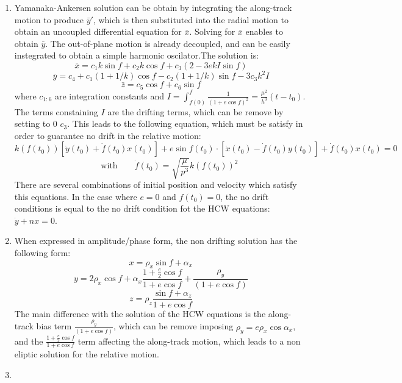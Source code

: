 \documentclass[a4paper]{article}
\begin{document}
\begin{enumerate}[label=\emph{\alph*)}]
    \item  %
      Yamanaka-Ankersen solution can be obtain by integrating the along-track motion to produce $\bar{y}'$, which is then substituted into the radial motion to obtain an uncoupled differential equation for $\bar{x}$. Solving for $\bar{x}$ enables to obtain  $\bar{y}$. The out-of-plane motion is already decoupled, and can be easily instegrated to obtain a simple harmonic oscilator.The solution is:
   \[\bar{x} = c_1 k \sin{f}+c_2 k \cos{f} + c_3 (2 - 3 e k I\sin{f})\]
   \[\bar{y} = c_4 + c_1 (1+1/k)\cos{f} - c_2 (1+1/k) \sin{f} - 3 c_3 k^2 I \]
   \[\bar{z} = c_5 \cos{f} + c_6 \sin{f}\]
   where $c_{1:6}$ are integration constants and $I = \int_{f(0)}^{f}{\frac{1}{(1+e\cos{f})^2}} = \frac{\mu^2}{h^3}(t-t_0)$. The terms constaining $I$ are the drifting terms, which can be remove by setting to 0 $c_3$. This leads to the following equation, which must be satisfy in order to guarantee no drift in the relative motion:
   \[k(f(t_0)) [\dot{y}(t_0)+\dot{f}(t_0)x(t_0)] + e \sin{f(t_0)}\cdot [\dot{x}(t_0) - \dot{f}(t_0)y(t_0)] + \dot{f}(t_0)x(t_0) = 0 \]
   \[ \qquad  \mathrm{with} \qquad \dot{f}(t_0) = \sqrt{\frac{\mu}{p^3}}k(f(t_0))^2  \]
   There are several combinations of initial position and velocity which satisfy this equations. In the case where $e=0$ and $f(t_0)=0$, the no drift conditions is equal to the no drift condition fot the HCW equations: $\dot{y}+nx=0$.
  
 \item %
   When expressed in amplitude/phase form, the non drifting solution has the following form:
   \[x = \rho_x \sin{f+\alpha_x} \]
   \[y = 2 \rho_x \cos{f+\alpha_x} \frac{1+\frac{e}{2}\cos{f}}{1+e\cos{f}} + \frac{\rho_y}{(1+e\cos{f})} \]
   \[z = \rho_z \frac{\sin{f+\alpha_z}}{1+e\cos{f}} \]
   The main difference with the solution of the HCW equations is the along-track bias term  $\frac{\rho_y}{(1+e\cos{f})}$, which can be remove imposing $\rho_y=e\rho_x\cos{\alpha_x}$,  and the $\frac{1+\frac{e}{2}\cos{f}}{1+e\cos{f}}$ term affecting the along-track motion, which leads to a non eliptic solution for the relative motion.
 
  \item %
  
\end{enumerate}
\end{document}
